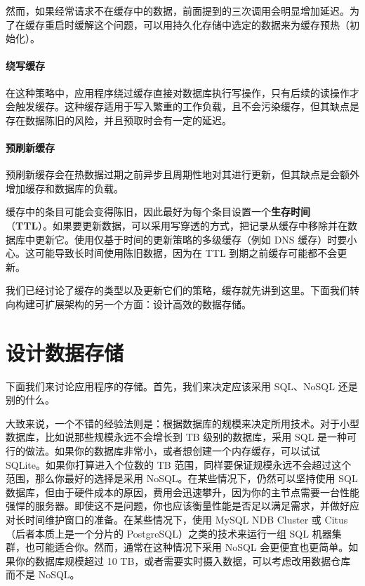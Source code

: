\label{idx:393}
然而，如果经常请求不在缓存中的数据，前面提到的三次调用会明显增加延迟。为了在缓存重启时缓解这个问题，可以用持久化存储中选定的数据来为缓存预热（初始化）。

\paragraph{绕写缓存}

\label{idx:394}
在这种策略中，应用程序绕过缓存直接对数据库执行写操作，只有后续的读操作才会触发缓存。这种缓存适用于写入繁重的工作负载，且不会污染缓存，但其缺点是存在数据陈旧的风险，并且预取时会有一定的延迟。


\paragraph{预刷新缓存}

\label{idx:395}
预刷新缓存会在热数据过期之前异步且周期性地对其进行更新，但其缺点是会额外增加缓存和数据库的负载。


\label{idx:396}
缓存中的条目可能会变得陈旧，因此最好为每个条目设置一个\textbf{生存时间 }（\textbf{TTL}）。如果要更新数据，可以采用写穿透的方式，把记录从缓存中移除并在数据库中更新它。使用仅基于时间的更新策略的多级缓存（例如 DNS 缓存）时要小心。这可能导致长时间使用陈旧数据，因为在 TTL 到期之前缓存可能都不会更新。

我们已经讨论了缓存的类型以及更新它们的策略，缓存就先讲到这里。下面我们转向构建可扩展架构的另一个方面：设计高效的数据存储。

\section{设计数据存储}

\label{idx:397}
下面我们来讨论应用程序的存储。首先，我们来决定应该采用 SQL、NoSQL 还是别的什么。

\label{idx:398}
大致来说，一个不错的经验法则是：根据数据库的规模来决定所用技术。对于小型数据库，比如说那些规模永远不会增长到 TB 级别的数据库，采用 SQL 是一种可行的做法。如果你的数据库非常小，或者想创建一个内存缓存，可以试试 SQLite。如果你打算进入个位数的 TB 范围，同样要保证规模永远不会超过这个范围，那么你最好的选择是采用 NoSQL。在某些情况下，仍然可以坚持使用 SQL 数据库，但由于硬件成本的原因，费用会迅速攀升，因为你的主节点需要一台性能强悍的服务器。即使这不是问题，你也应该衡量性能是否足以满足需求，并做好应对长时间维护窗口的准备。在某些情况下，使用 MySQL NDB Cluster 或 Citus（后者本质上是一个分片的 PostgreSQL）之类的技术来运行一组 SQL 机器集群，也可能适合你。然而，通常在这种情况下采用 NoSQL 会更便宜也更简单。如果你的数据库规模超过 10 TB，或者需要实时摄入数据，可以考虑改用数据仓库而不是 NoSQL。

